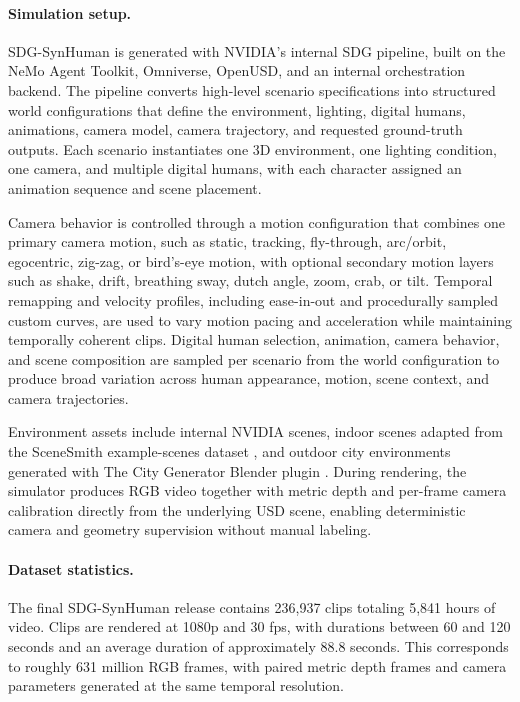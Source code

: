 \paragraph{Simulation setup.}
\label{appendix:sdg_synhuman_simulation_setup}
SDG-SynHuman is generated with NVIDIA's internal SDG pipeline, built on the NeMo Agent Toolkit, Omniverse, OpenUSD, and an internal orchestration backend. The pipeline converts high-level scenario specifications into structured world configurations that define the environment, lighting, digital humans, animations, camera model, camera trajectory, and requested ground-truth outputs. Each scenario instantiates one 3D environment, one lighting condition, one camera, and multiple digital humans, with each character assigned an animation sequence and scene placement.

Camera behavior is controlled through a motion configuration that combines one primary camera motion, such as static, tracking, fly-through, arc/orbit, egocentric, zig-zag, or bird's-eye motion, with optional secondary motion layers such as shake, drift, breathing sway, dutch angle, zoom, crab, or tilt. Temporal remapping and velocity profiles, including ease-in-out and procedurally sampled custom curves, are used to vary motion pacing and acceleration while maintaining temporally coherent clips. Digital human selection, animation, camera behavior, and scene composition are sampled per scenario from the world configuration to produce broad variation across human appearance, motion, scene context, and camera trajectories.

Environment assets include internal NVIDIA scenes, indoor scenes adapted from the SceneSmith example-scenes dataset \citep{pfaff2026scenesmith}, and outdoor city environments generated with The City Generator Blender plugin \citep{durr2026citygenerator}. During rendering, the simulator produces RGB video together with metric depth and per-frame camera calibration directly from the underlying USD scene, enabling deterministic camera and geometry supervision without manual labeling.

\paragraph{Dataset statistics.}
\label{appendix:sdg_synhuman_dataset_statistics}
The final SDG-SynHuman release contains 236{,}937 clips totaling 5{,}841 hours of video. Clips are rendered at 1080p and 30 fps, with durations between 60 and 120 seconds and an average duration of approximately 88.8 seconds. This corresponds to roughly 631 million RGB frames, with paired metric depth frames and camera parameters generated at the same temporal resolution.

